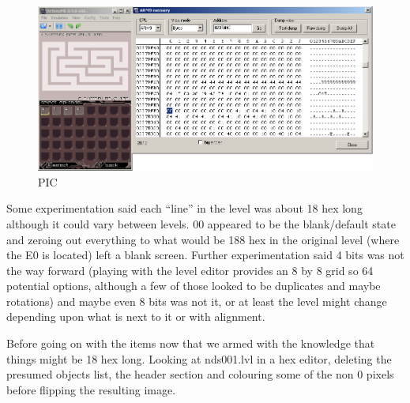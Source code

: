 \documentclass[
]{book}
\begin{document}
\begin{figure}
\centering
\includegraphics{images/174_home_fast6191_romhackingguide_unrenamed_fil___ers_romhackingguideleveleditingworkedNplus7.png}
\caption{PIC}
\end{figure}

Some experimentation said each ``line'' in the level was about 18 hex long although it could vary between levels. 00 appeared to be the blank/default state and zeroing out everything to what would be 188 hex in the original level (where the E0 is located) left a blank screen. Further experimentation said 4 bits was not the way forward (playing with the level editor provides an 8 by 8 grid so 64 potential options, although a few of those looked to be duplicates and maybe rotations) and maybe even 8 bits was not it, or at least the level might change depending upon what is next to it or with alignment.

Before going on with the items now that we armed with the knowledge that things might be 18 hex long. Looking at nds001.lvl in a hex editor, deleting the presumed objects list, the header section and colouring some of the non 0 pixels before flipping the resulting image.
\end{document}
